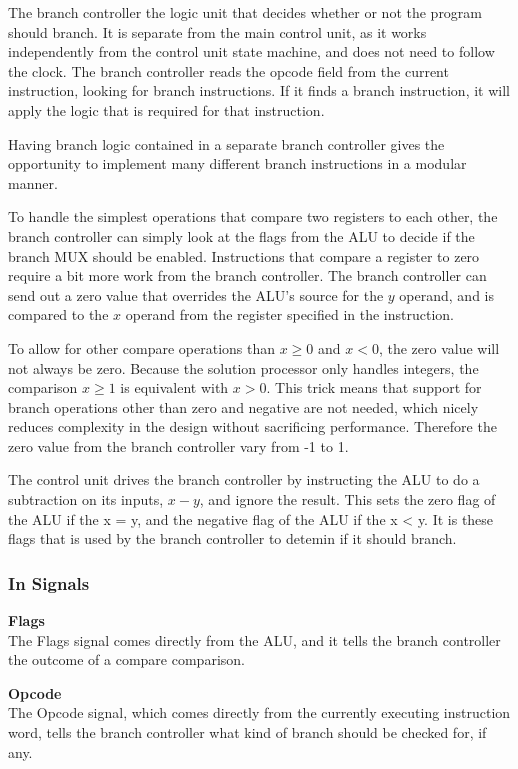 The branch controller the logic unit that decides whether or not the program should branch.
It is separate from the main control unit, as it works independently from the control unit state machine, and does not need to follow the clock.
The branch controller reads the opcode field from the current instruction, looking for branch instructions.
If it finds a branch instruction, it will apply the logic that is required for that instruction.

Having branch logic contained in a separate branch controller gives the opportunity to implement many different branch instructions in a modular manner.

To handle the simplest operations that compare two registers to each other, the branch controller can simply look at the flags from the ALU to decide if the branch MUX should be enabled.
Instructions that compare a register to zero require a bit more work from the branch controller.
The branch controller can send out a zero value that overrides the ALU's source for the $ y $ operand, and is compared to the $ x $ operand from the register specified in the instruction.

To allow for other compare operations than $x \geq 0$ and $x < 0$, the zero value will not always be zero. 
Because the solution processor only handles integers, the comparison $ x \geq 1 $ is equivalent with $ x > 0 $.
This trick means that support for branch operations other than zero and negative are not needed, which nicely reduces complexity in the design without sacrificing performance.
Therefore the zero value from the branch controller vary from -1 to 1.

The control unit drives the branch controller by instructing the ALU to do a subtraction on its inputs, $ x - y $, and ignore the result.
This sets the zero flag of the ALU if the x = y, and the negative flag of the ALU if the x < y.
It is these flags that is used by the branch controller to detemin if it should branch.

\subsubsection{In Signals}

\begin{description}
\item{\textbf{Flags}} \\

The Flags signal comes directly from the ALU, and it tells the branch controller the outcome of a compare comparison.

\item{\textbf{Opcode}} \\

The Opcode signal, which comes directly from the currently executing instruction word, tells the branch controller what kind of branch should be checked for, if any.

\end{description}

